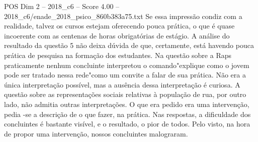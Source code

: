 \begin{textsample}{POS Dim 2 – 2018\_c6 – Score 4.00 – 2018\_c6/enade\_2018\_psico\_860b383a75.txt}
Se essa impressão condiz com a realidade, talvez os cursos estejam oferecendo pouca prática, o que é quase incoerente com as centenas de horas obrigatórias de estágio.
A análise do resultado da questão 5 não deixa dúvida de que, certamente, está havendo pouca prática de pesquisa na formação dos estudantes.
Na questão sobre a Raps praticamente nenhum concluinte interpretou o comando"explique como o jovem pode ser tratado nessa rede"como um convite a falar de sua prática.
Não era a única interpretação possível, mas a ausência dessa interpretação é curiosa.
A questão sobre as representações sociais relativas à população de rua, por outro lado, não admitia outras interpretações.
O que era pedido era uma intervenção, pedia -se a descrição de o que fazer, na prática.
Nas respostas, a dificuldade dos concluintes é bastante visível, e o resultado, o pior de todos.
Pelo visto, na hora de propor uma intervenção, nossos concluintes malograram.

\end{textsample}
